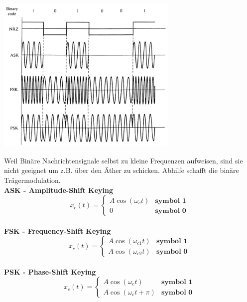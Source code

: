 \begin{minipage}{9cm}
	\includegraphics[width=8.7cm]{bilder/dig_traegermodulation.png}
\end{minipage}
\begin{minipage}{9cm}
	Weil Binäre Nachrichtensignale selbst zu kleine Frequenzen aufweisen, sind sie nicht geeignet um
	z.B. über den Äther zu schicken. Abhilfe schafft die binäre Trägermodulation. 
	\vspace{1cm}  \\
	\textbf{ASK - Amplitude-Shift Keying} \\
	$$x_c(t) = \begin{cases}
           A \cos(\omega_c t) & \textbf{symbol 1} \\
           0 & \textbf{symbol 0}
           \end{cases} $$ \\
	\textbf{FSK - Frequency-Shift Keying} \\
	$$x_c(t) = \begin{cases}
           A \cos(\omega_{c1} t) & \textbf{symbol 1}     \\         
           A \cos(\omega_{c2} t) & \textbf{symbol 0}
           \end{cases} $$ \\
	\textbf{PSK - Phase-Shift Keying} \\
	$$x_c(t) = \begin{cases}
           A \cos(\omega_{c} t) & \textbf{symbol 1}        \\      
           A \cos(\omega_{c} t + \pi) & \textbf{symbol 0}
           \end{cases} $$ \\
\end{minipage}

